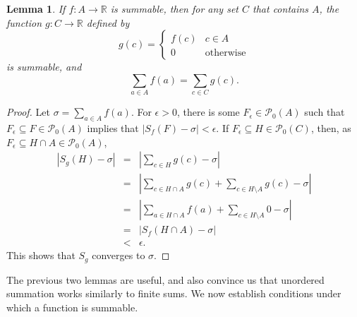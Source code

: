 \documentclass{article}
\newtheorem{lemma}[theorem]{Lemma}
\begin{document}
\begin{lemma}
If $f:A \to \mathbb{R}$ is summable, then for any set $C$ that contains $A$, the function $g:C \to \mathbb{R}$ defined by
\[
g(c) = \begin{cases}
f(c)&c \in A\\
0&\textrm{otherwise}
\end{cases}
\]
is summable, and
\[
\sum_{a \in A} f(a) = \sum_{c \in C} g(c).
\]
\label{nullsets}
\end{lemma}
\begin{proof}
Let $\sigma=\sum_{a \in A} f(a)$. For $\epsilon>0$, there is some $F_\epsilon \in \mathscr{P}_0(A)$ such that 
$F_\epsilon \subseteq F \in \mathscr{P}_0(A)$ implies that $|S_f(F)-\sigma|<\epsilon$. If $F_\epsilon \subseteq H \in \mathscr{P}_0(C)$,
then, as $F_\epsilon \subseteq H \cap A \in \mathscr{P}_0(A)$,
\begin{eqnarray*}
|S_g(H)-\sigma|&=&\left| \sum_{c \in H} g(c) - \sigma\right|\\
& =& \left| \sum_{c \in H \cap A} g(c) + \sum_{c \in H \setminus A} g(c) - \sigma\right|\\
&=&\left| \sum_{a \in H \cap A} f(a) + \sum_{c \in H \setminus A} 0 - \sigma\right|\\
&=&|S_f(H \cap A) - \sigma|\\
&<&\epsilon.
\end{eqnarray*}
This shows that $S_g$ converges to $\sigma$.
\end{proof}

The previous two lemmas are useful, and also convince us that unordered summation works similarly to finite sums. 
We now establish conditions under which a function is summable.
\end{document}
